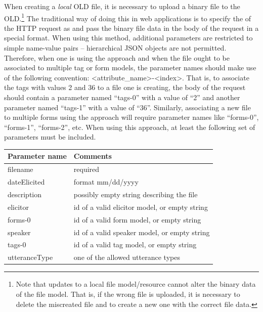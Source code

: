 \documentclass[letterpaper,10pt,english]{sphinxmanual}
\begin{document}
When creating a \emph{local} OLD file, it is necessary to upload a binary file to the
OLD.\footnote{
Note that updates to a local file model/resource cannot alter the
binary data of the file model.  That is, if the wrong file is uploaded, it is
necessary to delete the miscreated file and to create a new one with the
correct file data.
}  The traditional way of doing this in web applications is to
specify the  of the HTTP request as  and
pass the binary file data in the body of the request in a special format.  When
using this method, additional parameters are restricted to simple name-value
pairs -- hierarchical JSON objects are not permitted.  Therefore, when one is
using the  approach and when the file ought to be
associated to multiple tag or form models, the parameter names should make use
of the following convention: \textless{}attribute\_name\textgreater{}-\textless{}index\textgreater{}.  That is, to associate
the tags with  values 2 and 36 to a file one is creating, the body of the
request should contain a parameter named ``tags-0'' with a value of ``2'' and
another parameter named ``tags-1'' with a value of ``36''.  Similarly, associating
a new file to multiple forms using the  approach will
require parameter names like ``forms-0'', ``forms-1'', ``forms-2'', etc.  When using
this approach, at least the following set of parameters must be included.

\begin{tabulary}{\linewidth}{|L|L|}
\hline
\textbf{
Parameter name
} & \textbf{
Comments
}\\\hline

filename
 & 
required
\\\hline

dateElicited
 & 
format mm/dd/yyyy
\\\hline

description
 & 
possibly empty string describing the file
\\\hline

elicitor
 & 
id of a valid elicitor model, or empty string
\\\hline

forms-0
 & 
id of a valid form model, or empty string
\\\hline

speaker
 & 
id of a valid speaker model, or empty string
\\\hline

tags-0
 & 
id of a valid tag model, or empty string
\\\hline

utteranceType
 & 
one of the allowed utterance types
\\\hline
\end{tabulary}
\end{document}

